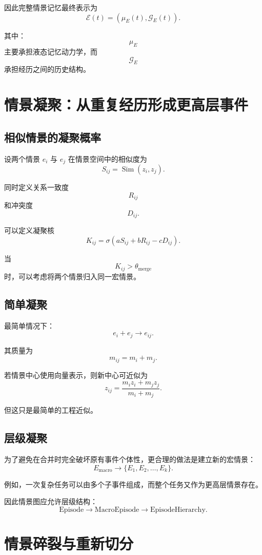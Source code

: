 因此完整情景记忆最终表示为
\[
\boxed{
\mathcal{E}(t)
=
\left(
\mu_E(t),
\mathcal{G}_E(t)
\right).
}
\]

其中：
\[
\mu_E
\]
主要承担液态记忆动力学，而
\[
\mathcal{G}_E
\]
承担经历之间的历史结构。

\section{情景凝聚：从重复经历形成更高层事件}

\subsection{相似情景的凝聚概率}

设两个情景 $e_i$ 与 $e_j$ 在情景空间中的相似度为
\[
S_{ij}
=
\operatorname{Sim}(z_i,z_j).
\]

同时定义关系一致度
\[
R_{ij}
\]
和冲突度
\[
D_{ij}.
\]

可以定义凝聚核
\[
\boxed{
K_{ij}
=
\sigma
\left(
aS_{ij}
+
bR_{ij}
-
cD_{ij}
\right).
}
\]

当
\[
K_{ij}>\theta_{\mathrm{merge}}
\]
时，可以考虑将两个情景归入同一宏情景。

\subsection{简单凝聚}

最简单情况下：
\[
e_i+e_j
\rightarrow
e_{ij}.
\]

其质量为
\[
m_{ij}
=
m_i+m_j.
\]

若情景中心使用向量表示，则新中心可近似为
\[
z_{ij}
=
\frac{
m_i z_i
+
m_j z_j
}{
m_i+m_j
}.
\]

但这只是最简单的工程近似。

\subsection{层级凝聚}

为了避免在合并时完全破坏原有事件个体性，更合理的做法是建立新的宏情景：
\[
\boxed{
E_{\mathrm{macro}}
\rightarrow
\{E_1,E_2,\ldots,E_k\}.
}
\]

例如，一次复杂任务可以由多个子事件组成，而整个任务又作为更高层情景存在。

因此情景图应允许层级结构：
\[
\boxed{
\mathrm{Episode}
\rightarrow
\mathrm{MacroEpisode}
\rightarrow
\mathrm{EpisodeHierarchy}.
}
\]

\section{情景碎裂与重新切分}

